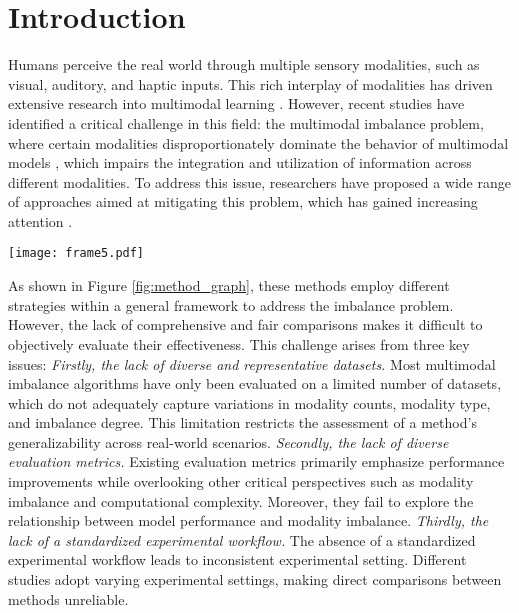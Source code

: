 \section{Introduction}
Humans perceive the real world through multiple sensory modalities, such as visual, auditory, and haptic inputs. This rich interplay of modalities has driven extensive research into multimodal learning \cite{Bal_MM}. However, recent studies have identified a critical challenge in this field: the multimodal imbalance problem, where certain modalities disproportionately dominate the behavior of multimodal models \cite{Peng_2022_CVPR}, which impairs the integration and utilization of information across different modalities. To address this issue, researchers have proposed a wide range of approaches aimed at mitigating this problem, which has gained increasing attention \cite{Peng_2022_CVPR,Gblending_Wang,MMCosine_Xu,AGM_Li,CML_Ma,Greedy_Wu,MMPareto_Wei,PMR_Fan,UMT_Du,ReconBoost_Huang}.

\begin{figure*}[t]
    \centering
    \texttt{[image: frame5.pdf]}
    \caption{The general framework of multimodal imbalance learning. Group 1 applies adjustments during data processing. Group 2 modifies the fusion module in the feed-forward propagation. Group 3 adapts learning objectives, and Group 4 focuses on optimization adjustments.}
    \label{fig:method_graph}
    \vspace{-15pt}
\end{figure*}

As shown in Figure \ref{fig:method_graph}, these methods employ different strategies within a general framework to address the imbalance problem. However, the lack of comprehensive and fair comparisons makes it difficult to objectively evaluate their effectiveness. This challenge arises from three key issues:
\textit{Firstly, the lack of diverse and representative datasets.} Most multimodal imbalance algorithms have only been evaluated on a limited number of datasets, which do not adequately capture variations in modality counts, modality type, and imbalance degree. This limitation restricts the assessment of a method’s generalizability across real-world scenarios.
\textit{Secondly, the lack of diverse evaluation metrics.} Existing evaluation metrics primarily emphasize performance improvements while overlooking other critical perspectives such as modality imbalance and computational complexity. Moreover, they fail to explore the relationship between model performance and modality imbalance.
\textit{Thirdly, the lack of a standardized experimental workflow.} The absence of a standardized experimental workflow leads to inconsistent experimental setting. Different studies adopt varying experimental settings, making direct comparisons between methods unreliable. 

